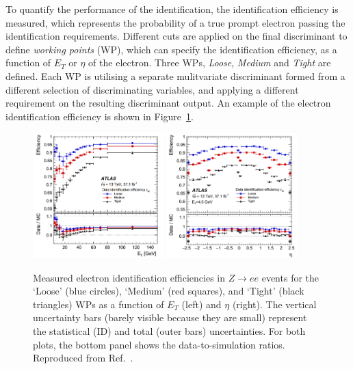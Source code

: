 To quantify the performance of the identification, 
the identification efficiency is measured, 
which represents the probability of
a true prompt electron passing the identification requirements.
Different cuts are applied on the final discriminant
to define \textit{working points} (WP), which can specify 
the identification efficiency, as a function of $E_T$ or $\eta$ of the electron. 
Three WPs, \textit{Loose}, \textit{Medium} and \textit{Tight} are defined.
Each WP is
utilising a separate mulitvariate discriminant formed from 
a different selection of discriminating variables, 
and applying a different requirement on the resulting discriminant output.
An example of the electron identification efficiency 
is shown in Figure~\ref{fig:electron_ID}.
\begin{figure}[bht]
    \begin{centering}	
    \includegraphics[width=0.45\textwidth]{Reconstruction/plots/electrond_ID1.png}
    \includegraphics[width=0.45\textwidth]{Reconstruction/plots/electrond_ID2.png}
    \caption{Measured electron identification efficiencies in $Z \rightarrow ee$
    events for the `Loose' (blue circles), `Medium' (red squares), 
    and `Tight' (black triangles) WPs as a function of $E_T$ (left) and $\eta$ (right). 
    The vertical uncertainty bars (barely visible because they are small) 
    represent the statistical (ID) and total (outer bars) uncertainties. 
    For both plots, the bottom panel shows the data-to-simulation
    ratios. Reproduced from Ref.~\cite{PERF-2017-01}.}
    \label{fig:electron_ID}
    \end{centering}
\end{figure}

